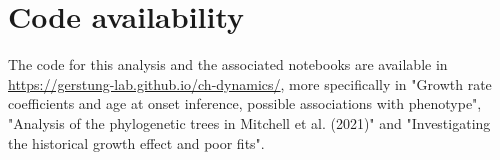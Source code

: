 \section{Code availability}

The code for this analysis and the associated notebooks are available in \url{https://gerstung-lab.github.io/ch-dynamics/}, more specifically in "Growth rate coefficients and age at onset inference, possible associations with phenotype", "Analysis of the phylogenetic trees in Mitchell et al. (2021)" and "Investigating the historical growth effect and poor fits".